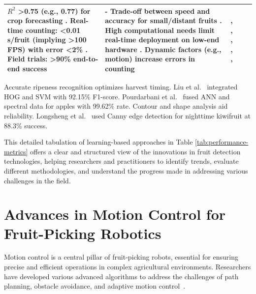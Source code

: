 \documentclass[a4paper,fleqn]{cas-dc}
\begin{document}
\begin{table}[htbp]
\begin{tabular}{@{}p{1.5cm}p{2.5cm}p{5cm}p{4cm}p{2.5cm}@{}}
$R^2$ >0.75 (e.g., 0.77) for crop forecasting \cite{underwood2016mapping}. Real-time counting: <0.01 s/fruit (implying >100 FPS) with error <2\% \cite{altaheri2019date}. Field trials: >90\% end-to-end success \cite{birrell2020field} & - Trade-off between speed and accuracy for small/distant fruits \cite{kang2020real}. High computational needs limit real-time deployment on low-end hardware \cite{altaheri2019date}. Dynamic factors (e.g., motion) increase errors in counting \cite{underwood2016mapping} & \cite{underwood2016mapping}, \cite{lin2019guava}, \cite{kang2019fruit}, \cite{kang2020real}, \cite{altaheri2019date}, \cite{birrell2020field} \\ \bottomrule
\end{tabular}
\end{table}

Accurate ripeness recognition optimizes harvest timing. 
Liu et al.~\cite{liu2019mature} integrated HOG and SVM with 92.15\% F1-score. 
Pourdarbani et al.~\cite{pourdarbani2020automatic} fused ANN and spectral data for apples with 99.62\% rate.
Contour and shape analysis aid reliability. 
Longsheng et al.~\cite{longsheng2015kiwifruit} used Canny edge detection for nighttime kiwifruit at 88.3\% success.


This detailed tabulation of learning-based approaches in Table \ref{tab:performance-metrics} offers a clear and structured view of the innovations in fruit detection technologies, helping researchers and practitioners to identify trends, evaluate different methodologies, and understand the progress made in addressing various challenges in the field.

\section{Advances in Motion Control for Fruit-Picking Robotics}
Motion control is a central pillar of fruit-picking robots, essential for ensuring precise and efficient operations in complex agricultural environments. Researchers have developed various advanced algorithms to address the challenges of path planning, obstacle avoidance, and adaptive motion control~\cite{Ahmad:2023_bnb, Loganathan:2024_hho_avoa, Teo:2020, Arrouch:2022b, 10746490}.
\end{document}
